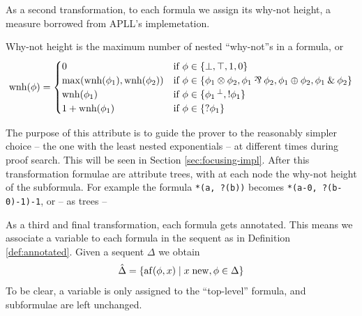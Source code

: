 \documentclass[a4paper, 12pt, english]{report}
\begin{document}
As a second transformation, to each formula we assign its why-not height, a measure borrowed from APLL's implemetation.
\begin{define}
	\label{def:why-not-height}
	Why-not height is the maximum number of nested ``why-not''s in a formula, or
	$$ \text{wnh}(\phi) = 
	\begin{cases}	
		0 & \text{if }\phi \in \{\llbot, \lltop, \llone, \llzero\} \\
		\max(\text{wnh}(\phi_1), \text{wnh}(\phi_2)) & \text{if } \phi \in \{ \phi_1 \llten \phi_2, \phi_1 \llpar \phi_2, \phi_1 \llplus \phi_2, \phi_1 \llwith \phi_2 \} \\
		\text{wnh}(\phi_1) & \text{if }\phi \in \{ \llnot{\phi_1}, \llbang{\phi_1}\} \\
		1 + \text{wnh}(\phi_1) & \text{if }\phi \in \{ \llwn{\phi_1} \} 
	\end{cases}
	$$
\end{define}
The purpose of this attribute is to guide the prover to the reasonably simpler choice -- the one with the least nested exponentials -- at different times during proof search.
This will be seen in Section \ref{sec:focusing-impl}.
After this transformation formulae are attribute trees, with at each node the why-not height of the subformula.
For example the formula \texttt{*(a, ?(b))} becomes \texttt{*(a-0, ?(b-0)-1)-1}, or -- as trees --
\begin{figure}[H]
	\centering
\end{figure}

As a third and final transformation, each formula gets annotated.
This means we associate a variable to each formula in the sequent as in Definition \ref{def:annotated}.
Given a sequent $\Delta$ we obtain
$$ \hat{\Delta} = \{ \mathrm{af}(\phi, x) \mid x \; \mathrm{new}, \phi \in \Delta \} $$
To be clear, a variable is only assigned to the ``top-level'' formula, and subformulae are left unchanged.
\end{document}
